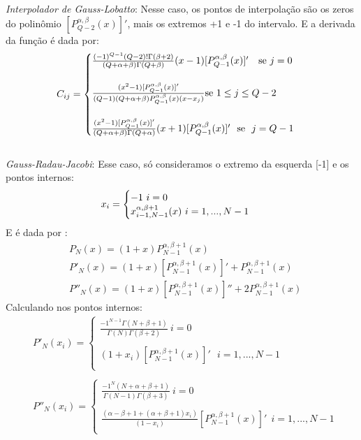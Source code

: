  \emph{Interpolador de Gauss-Lobatto}: Nesse caso, os pontos de interpolação são os zeros do polinômio $[P^{\alpha,\beta}_{Q-2}(x)]'$, mais os extremos +1 e -1 do intervalo. E a derivada da função é dada por:
\begin{equation}
 C_{ij}= 
\begin{cases}
 \frac{(-1)^{Q - 1}(Q-2)!\Gamma(\beta +2)}{(Q + \alpha + \beta)\Gamma(Q + \beta)}(x-1)[P^{\alpha,\beta}_{Q-1}(x)]'\  \  \ \text{se}\  j = 0 \\\\
 \frac{(x^2 -1)[P^{\alpha,\beta}_{Q-1}(x)]'}{(Q-1)(Q + \alpha + \beta)P^{\alpha,\beta}_{Q-1}(x)(x-x_j)} \text{se}\  1 \leq j \leq Q-2\\\\
 \frac{(x^2 -1)[P^{\alpha,\beta}_{Q-1}(x)]'}{(Q + \alpha + \beta)\Gamma(Q+\alpha)}(x+1)[P^{\alpha,\beta}_{Q-1}(x)]' \ \ \text{se} \ \ j = Q - 1
\end{cases}\\
\end{equation} 
\\
 \emph{Gauss-Radau-Jacobi}: Esse caso, só consideramos o extremo da esquerda [-1] e os pontos internos:
 \begin{equation}
 x_{i}= 
\begin{cases}
 -1 \ i = 0\\
 x^{\alpha,\beta +1}_{i-1,N-1}(x) \ i= 1,...,N-1\\
\end{cases}\\
 \end{equation}
 E é dada por :
 \begin{align}
  & P_{N}(x) = (1+x)P^{\alpha,\beta+1}_{N -1}(x)\\
  & P'_{N}(x) = (1+x)[P^{\alpha,\beta+1}_{N -1}(x)]' + P^{\alpha,\beta+1}_{N -1}(x)\\
  & P''_{N}(x) = (1+x)[P^{\alpha,\beta+1}_{N -1}(x)]'' + 2P^{\alpha,\beta+1}_{N -1}(x)
 \end{align}
 Calculando nos pontos internos:
 \begin{align}
  & P'_{N}(x_i)= 
\begin{cases}
 \frac{-1^{N-1}\Gamma(N+\beta+1)}{\Gamma(N)\Gamma(\beta+2)} \ i =0\\ \\
 (1+x_i)[P^{\alpha,\beta+1}_{N -1}(x)]' \ \ \ i= 1,...,N-1\\ 
\end{cases}\\ \\
  & P''_{N}(x_i)= 
\begin{cases}
 \frac{-1^{N} (N+\alpha+\beta+1)}{\Gamma(N-1)\Gamma(\beta+3)} \ i =0\\  \\
 \frac{(\alpha -\beta +1+(\alpha+\beta+1)x_i)}{(1-x_i)}[P^{\alpha,\beta+1}_{N -1}(x)]' \ \ i= 1,...,N-1\\
\end{cases}\\
 \end{align}\\
